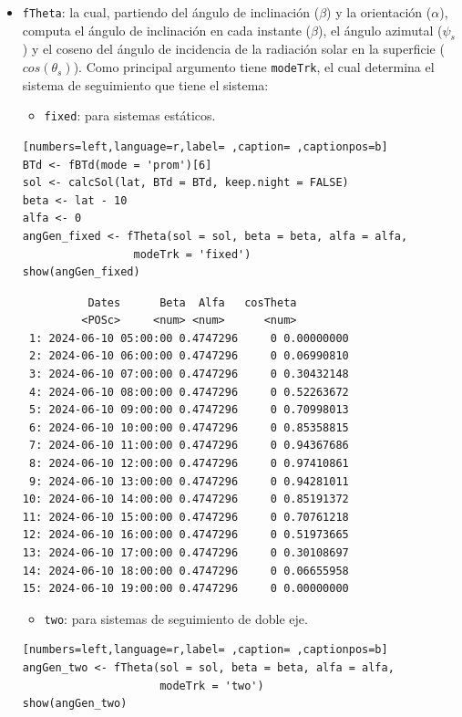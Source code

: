 \begin{itemize}
\item \texttt{fTheta}: la cual, partiendo del ángulo de inclinación (\(\beta\)) y la orientación (\(\alpha\)), computa el ángulo de inclinación en cada instante (\(\beta\)), el ángulo azimutal (\(\psi_s\)) y el coseno del ángulo de incidencia  de la radiación solar en la superficie (\(cos(\theta_s)\)).
Como principal argumento tiene \texttt{modeTrk}, el cual determina el sistema de seguimiento que tiene el sistema:
\begin{itemize}
\item \texttt{fixed}: para sistemas estáticos.
\end{itemize}
\begin{lstlisting}[numbers=left,language=r,label= ,caption= ,captionpos=b]
BTd <- fBTd(mode = 'prom')[6] 
sol <- calcSol(lat, BTd = BTd, keep.night = FALSE)
beta <- lat - 10
alfa <- 0
angGen_fixed <- fTheta(sol = sol, beta = beta, alfa = alfa,
                 modeTrk = 'fixed')
show(angGen_fixed)
\end{lstlisting}

\begin{verbatim}
		  Dates      Beta  Alfa   cosTheta
		 <POSc>     <num> <num>      <num>
 1: 2024-06-10 05:00:00 0.4747296     0 0.00000000
 2: 2024-06-10 06:00:00 0.4747296     0 0.06990810
 3: 2024-06-10 07:00:00 0.4747296     0 0.30432148
 4: 2024-06-10 08:00:00 0.4747296     0 0.52263672
 5: 2024-06-10 09:00:00 0.4747296     0 0.70998013
 6: 2024-06-10 10:00:00 0.4747296     0 0.85358815
 7: 2024-06-10 11:00:00 0.4747296     0 0.94367686
 8: 2024-06-10 12:00:00 0.4747296     0 0.97410861
 9: 2024-06-10 13:00:00 0.4747296     0 0.94281011
10: 2024-06-10 14:00:00 0.4747296     0 0.85191372
11: 2024-06-10 15:00:00 0.4747296     0 0.70761218
12: 2024-06-10 16:00:00 0.4747296     0 0.51973665
13: 2024-06-10 17:00:00 0.4747296     0 0.30108697
14: 2024-06-10 18:00:00 0.4747296     0 0.06655958
15: 2024-06-10 19:00:00 0.4747296     0 0.00000000
\end{verbatim}

\begin{itemize}
\item \texttt{two}: para sistemas de seguimiento de doble eje.
\end{itemize}
\begin{lstlisting}[numbers=left,language=r,label= ,caption= ,captionpos=b]
angGen_two <- fTheta(sol = sol, beta = beta, alfa = alfa,
                     modeTrk = 'two')
show(angGen_two)
\end{lstlisting}


\end{itemize}
